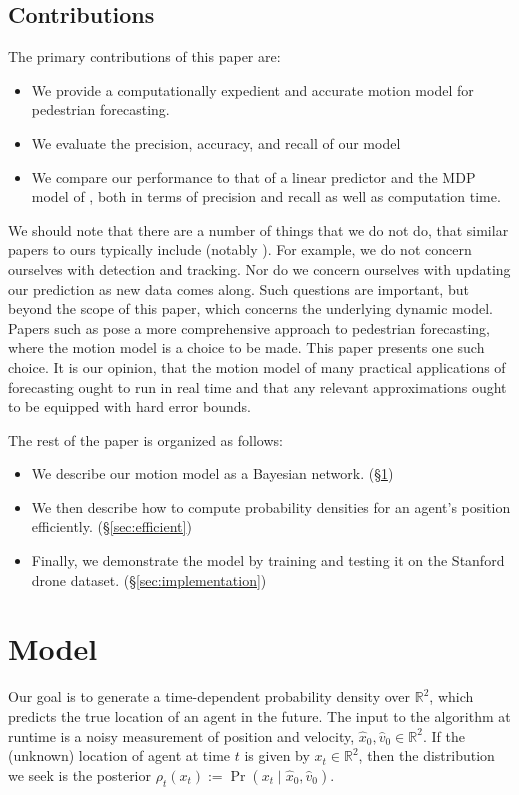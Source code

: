 \documentclass[conference]{IEEEtran}
\begin{document}
\subsection{Contributions}

The primary contributions of this paper are:
\begin{itemize}
	\item We provide a computationally expedient and accurate motion model for pedestrian forecasting.
	\item We evaluate the precision, accuracy, and recall of our model
	\item We compare our performance to that of a linear predictor and the MDP model of \cite{Kitani2012},
	both in terms of precision and recall as well as computation time.
\end{itemize}

We should note that there are a number of things that we do not do, that similar papers to ours typically include (notably \cite{Ballan2016,Karasev2016}).
For example, we do not concern ourselves with detection and tracking. Nor do we concern ourselves with updating our prediction as new data comes along.
Such questions are important, but beyond the scope of this paper, which concerns the underlying dynamic model.
Papers such as \cite{Ballan2016,Karasev2016} pose a more comprehensive approach to pedestrian forecasting, where the motion model is a choice to be made.
This paper presents one such choice.
It is our opinion, that the motion model of many practical applications of forecasting ought to run in real time and that any relevant approximations ought to be equipped with hard error bounds.

The rest of the paper is organized as follows:
\begin{itemize}
	\item We describe our motion model as a Bayesian network. (\S \ref{sec:model})
	\item We then describe how to compute probability densities for an agent's position efficiently. (\S \ref{sec:efficient})
	\item Finally, we demonstrate the model by training and testing it on the Stanford drone dataset. (\S \ref{sec:implementation})
\end{itemize}

\section{Model}\label{sec:model}
Our goal is to generate a time-dependent probability density over $\mathbb{R}^2$, which predicts the true location of an agent in the future.
The input to the algorithm at runtime is a noisy measurement of position and velocity, $\hat{x}_0, \hat{v}_0 \in \mathbb{R}^2$.
If the (unknown) location of agent at time $t$ is given by $x_t \in \mathbb{R}^2$, then the distribution we seek is the posterior $\rho_t(x_t) := \Pr( x_t \mid \hat{x}_0, \hat{v}_0 )$.
\end{document}
